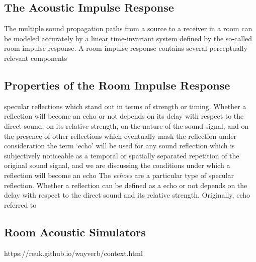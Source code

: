 \subsection{The Acoustic Impulse Response}
The multiple sound propagation paths from a source to a receiver in a room can be
modeled accurately by a linear time-invariant system defined by the so-called room impulse response.
A room impulse response contains several perceptually relevant components


\subsection{Properties of the Room Impulse Response}
 specular reflections which stand out in terms of strength or timing.
Whether a reflection will become an echo or not depends on its delay with respect to the direct sound, on its relative strength, on the nature of the sound signal, and on the presence of other reflections which eventually mask the reflection under consideration
the term ‘echo’ will be used for any sound reflection which
is subjectively noticeable as a temporal or spatially separated repetition of the original sound signal, and we are discussing the conditions under which a reflection will become an echo
The \textit{echoes} are a particular type of specular reflection.
Whether a reflection can be defined as a echo or not depends
on the delay with respect to the direct sound and its relative strength.
Originally, echo referred to



\subsection{Room Acoustic Simulators}
https://reuk.github.io/wayverb/context.html

